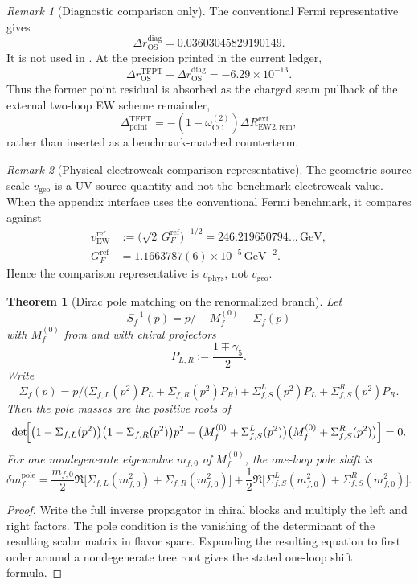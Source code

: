 \documentclass[11pt,a4paper]{article}
\newtheorem{theorem}{Theorem}[section]
\theoremstyle{definition}
\theoremstyle{remark}
\newtheorem*{remark}{Remark}
\newcommand{\omegaCCEW}{\omega_{\mathrm{CC}}^{(2)}}
\newcommand{\vgeo}{v_{\mathrm{geo}}}
\newcommand{\vewref}{v_{\mathrm{EW}}^{\mathrm{ref}}}
\begin{document}
\begin{remark}[Diagnostic comparison only]
The conventional Fermi representative gives
\[
\Delta r_{\mathrm{OS}}^{\mathrm{diag}}
=
0.03603045829190149.
\]
It is not used in . At the precision printed in the current
ledger,
\[
\Delta r_{\mathrm{OS}}^{\mathrm{TFPT}}
-
\Delta r_{\mathrm{OS}}^{\mathrm{diag}}
=
-6.29\times10^{-13}.
\]
Thus the former point residual is absorbed as the charged seam pullback of the external two-loop EW
scheme remainder,
\[
\Delta_{\mathrm{point}}^{\mathrm{TFPT}}
=
-\left(1-\omegaCCEW\right)
\Delta R_{\mathrm{EW2},\mathrm{rem}}^{\mathrm{ext}},
\]
rather than inserted as a benchmark-matched counterterm.
\end{remark}
\begin{remark}[Physical electroweak comparison representative]
The geometric source scale $\vgeo$ is a UV source quantity and not the benchmark electroweak value.
When the appendix interface uses the conventional Fermi benchmark, it compares against
\[
\begin{aligned}
\vewref
&:=
\bigl(\sqrt2\,G_F^{\mathrm{ref}}\bigr)^{-1/2}
=
246.219650794\ldots\,\mathrm{GeV},
\\
G_F^{\mathrm{ref}}
&=
1.1663787(6)\times 10^{-5}\,\mathrm{GeV}^{-2}.
\end{aligned}
\]
Hence the comparison representative is $v_{\mathrm{phys}}$, not $\vgeo$.
\end{remark}

\begin{theorem}[Dirac pole matching on the renormalized branch]
\label{thm:dirac-pole-matching}
Let
\[
S_f^{-1}(p)=p\!\!\!/-M_f^{(0)}-\Sigma_f(p)
\]
with $M_f^{(0)}$ from  and with chiral projectors
\[
P_{L,R}:=\frac{1\mp\gamma_5}{2}.
\]
Write
\[
\Sigma_f(p)=
p\!\!\!/\bigl(\Sigma_{f,L}(p^2)P_L+\Sigma_{f,R}(p^2)P_R\bigr)
+\Sigma_{f,S}^L(p^2)P_L+\Sigma_{f,S}^R(p^2)P_R.
\]
Then the pole masses are the positive roots of
\[
\det\!\Bigl[
\bigl(1-\Sigma_{f,L}(p^2)\bigr)\bigl(1-\Sigma_{f,R}(p^2)\bigr)p^2
-\bigl(M_f^{(0)}+\Sigma_{f,S}^L(p^2)\bigr)\bigl(M_f^{(0)}+\Sigma_{f,S}^R(p^2)\bigr)
\Bigr]=0.
\]
For one nondegenerate eigenvalue $m_{f,0}$ of $M_f^{(0)}$, the one-loop pole shift is
\[
\delta m_f^{\mathrm{pole}}
=
\frac{m_{f,0}}{2}\Re\bigl[\Sigma_{f,L}(m_{f,0}^2)+\Sigma_{f,R}(m_{f,0}^2)\bigr]
+\frac12\Re\bigl[\Sigma_{f,S}^L(m_{f,0}^2)+\Sigma_{f,S}^R(m_{f,0}^2)\bigr].
\]
\end{theorem}

\begin{proof}
Write the full inverse propagator in chiral blocks and multiply the left and right factors. The
pole condition is the vanishing of the determinant of the resulting scalar matrix in flavor space.
Expanding the resulting equation to first order around a nondegenerate tree root gives the stated
one-loop shift formula.
\end{proof}
\end{document}

